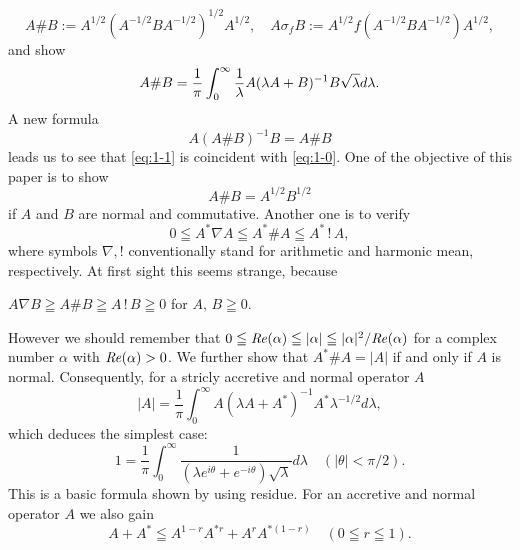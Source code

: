 \documentclass[reqno]{amsart}
\theoremstyle{definition}
\theoremstyle{remark}
\begin{document}
$$A\#B:=A^{1/2} (A^{-1/2} B A^{-1/2})^{1/2} A^{1/2}, \quad A\sigma_f B:= A^{1/2} 
f( A^{-1/2} B A^{-1/2}) A^{1/2},$$
and show 
\begin{equation}\label{eq:1-1}
A\#B= \frac{1}{\pi}\int_0^{\infty} \frac{1}{\lambda} 
A ( \lambda A + B)^{-1} B \sqrt{\lambda} d\lambda.\\
\end{equation}
A new formula  
$$A (A\# B)^{-1} B= A \# B$$
leads us to see that  \eqref{eq:1-1}  is coincident with \eqref{eq:1-0}. 
One of the objective of this paper is to show 
$$A\#B = A^{1/2} B^{1/2}$$
if $A$ and  $B$ are normal and commutative. Another one is to verify  
$$0\leqq A^*\nabla A \leqq A^* \# A \leqq A^* \,!\, A,$$
where symbols $\nabla, !$ conventionally stand for arithmetic and harmonic mean, 
respectively. At first sight this seems strange, because 
\begin{center}
$A \nabla B \geqq A \# B \geqq A \,!\, B\geqq 0$ for $A, \,B \geqq 0$.
\end{center}
However we should remember that $0\leqq {\it Re}(\alpha) \leqq |\alpha| \leqq 
|\alpha |^2 /{\it Re}(\alpha)$ for a complex number $\alpha$ with 
${\it Re}(\alpha) >0$.
We further show that $A^* \# A = | A |$ if and only if $A$ is normal. Consequently, for 
a stricly accretive and normal operator $A$  
$$|A|=  \frac{1}{\pi}\int_0^{\infty}A (\lambda A + A^*)^{-1} A^* 
\lambda^{-1/2} d \lambda , $$
which deduces the simplest case:
$$1 = \frac{1}{\pi} \int_0^{\infty} \frac{1}{(\lambda e^{i\theta}  +  e^{-i\theta})
\sqrt{\lambda} } d \lambda \quad (|\theta | < \pi/2). $$
This is a basic formula shown by using residue.
For an accretive and normal operator $A$ we also gain 
$$A + A^* \leqq   A^{1-r} A^{*r} + A^r A^{*(1-r)} \quad (0\leqq r \leqq 1).$$
\end{document}
